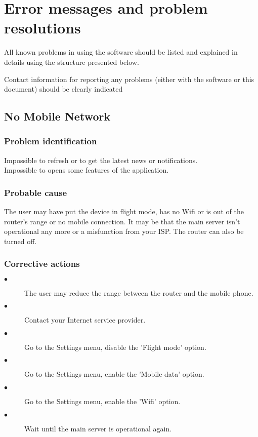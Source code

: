 
\chapter{Error messages and problem resolutions}
\label{chap:error_messages}

All known problems in using the software should be listed and explained in
details using the structure presented below.

Contact information for reporting any problems (either with the software or
this document) should be clearly indicated


\section{No Mobile Network}

\subsection{Problem identification}
Impossible to refresh or to get the latest news or notifications.\\
Impossible to opens some features of the application.\\

\subsection{Probable cause}
The user may have put the device in flight mode, has no Wifi or is out of the
router's range or no mobile connection. It may be that the main server isn't
operational any more or a misfunction from your ISP. The router can also be
turned off.

\subsection{Corrective actions}
\begin{description} 
\item[$\bullet$] The user may reduce the range between the router and the mobile
phone.
\item[$\bullet$] Contact your Internet service provider.
\item[$\bullet$] Go to the Settings menu, disable the 'Flight mode' option.
\item[$\bullet$] Go to the Settings menu, enable the 'Mobile data' option.
\item[$\bullet$] Go to the Settings menu, enable the 'Wifi' option.
\item[$\bullet$] Wait until the main server is operational again.
\end{description} 

